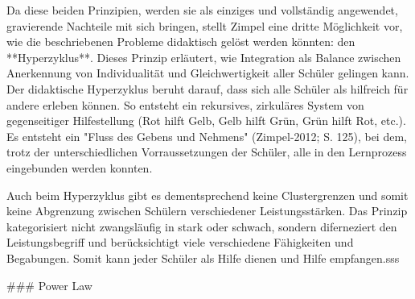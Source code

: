 Da diese beiden Prinzipien, werden sie als einziges und vollständig angewendet, gravierende Nachteile mit sich bringen, stellt Zimpel eine dritte Möglichkeit vor, wie die beschriebenen Probleme didaktisch gelöst werden könnten: den **Hyperzyklus**.
Dieses Prinzip erläutert, wie Integration als Balance zwischen Anerkennung von Individualität und Gleichwertigkeit aller Schüler gelingen kann.
Der didaktische Hyperzyklus beruht darauf, dass sich alle Schüler als hilfreich für andere erleben können.
So entsteht ein rekursives, zirkuläres System von gegenseitiger Hilfestellung (Rot hilft Gelb, Gelb hilft Grün, Grün hilft Rot, etc.).
Es entsteht ein "Fluss des Gebens und Nehmens" (Zimpel-2012; S. 125), bei dem, trotz der unterschiedlichen Vorraussetzungen der Schüler, alle in den Lernprozess eingebunden werden konnten.

Auch beim Hyperzyklus gibt es dementsprechend keine Clustergrenzen und somit keine Abgrenzung zwischen Schülern verschiedener Leistungsstärken.
Das Prinzip kategorisiert nicht zwangsläufig in stark oder schwach, sondern diferneziert den Leistungsbegriff und berücksichtigt viele verschiedene Fähigkeiten und Begabungen.
Somit kann jeder Schüler als Hilfe dienen und Hilfe empfangen.sss

### Power Law

